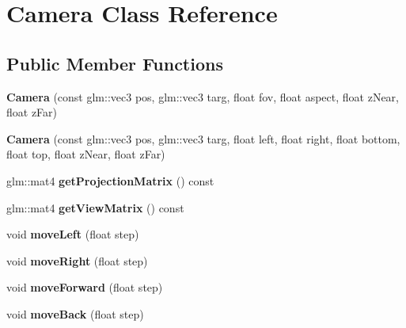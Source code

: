 \hypertarget{classCamera}{\section{Camera Class Reference}
\label{classCamera}
}
\subsection*{Public Member Functions}
\begin{DoxyCompactItemize}
\item 
\hypertarget{classCamera_a5f2c294d3d87bc07d79e6a4233d33e31}{{\bfseries Camera} (const glm\-::vec3 pos, glm\-::vec3 targ, float fov, float aspect, float z\-Near, float z\-Far)}\label{classCamera_a5f2c294d3d87bc07d79e6a4233d33e31}

\item 
\hypertarget{classCamera_a3303f128c523305dfbc5a24f1b06d320}{{\bfseries Camera} (const glm\-::vec3 pos, glm\-::vec3 targ, float left, float right, float bottom, float top, float z\-Near, float z\-Far)}\label{classCamera_a3303f128c523305dfbc5a24f1b06d320}

\item 
\hypertarget{classCamera_a8ceac1662a3b4bcde95094bb64c134ee}{glm\-::mat4 {\bfseries get\-Projection\-Matrix} () const }\label{classCamera_a8ceac1662a3b4bcde95094bb64c134ee}

\item 
\hypertarget{classCamera_a941940439c3704c7e5c75e6fd9fa6e7c}{glm\-::mat4 {\bfseries get\-View\-Matrix} () const }\label{classCamera_a941940439c3704c7e5c75e6fd9fa6e7c}

\item 
\hypertarget{classCamera_a9733e299c281288208e4ce36681143a6}{void {\bfseries move\-Left} (float step)}\label{classCamera_a9733e299c281288208e4ce36681143a6}

\item 
\hypertarget{classCamera_a70f638369d8bbcb60639f5b1cc40de19}{void {\bfseries move\-Right} (float step)}\label{classCamera_a70f638369d8bbcb60639f5b1cc40de19}

\item 
\hypertarget{classCamera_a8d10ea5b8790919325234395c7b04a6f}{void {\bfseries move\-Forward} (float step)}\label{classCamera_a8d10ea5b8790919325234395c7b04a6f}

\item 
\hypertarget{classCamera_aaa05f1c6290b5cb247ddd81a7b9d6b83}{void {\bfseries move\-Back} (float step)}\label{classCamera_aaa05f1c6290b5cb247ddd81a7b9d6b83}


\end{DoxyCompactItemize}
